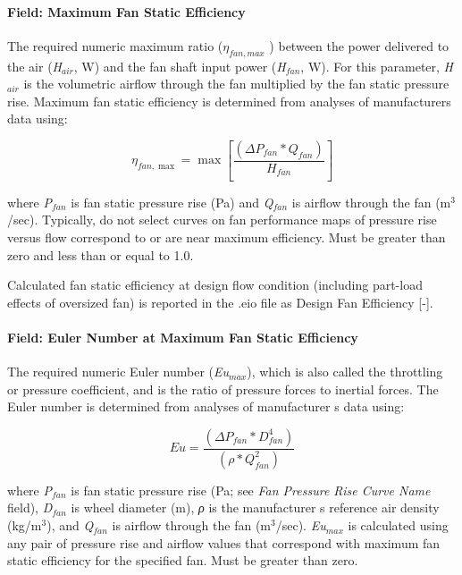 \paragraph{Field: Maximum Fan Static Efficiency}\label{field-maximum-fan-static-efficiency}

The required numeric maximum ratio (\(\eta_{fan,max}\) ) between the power delivered to the air (\emph{H\(_{air}\)}, W) and the fan shaft input power (\emph{H\(_{fan}\)}, W). For this parameter, \emph{H\(_{air}\)} is the volumetric airflow through the fan multiplied by the fan static pressure rise. Maximum fan static efficiency is determined from analyses of manufacturers data using:

\begin{equation}
{\eta_{fan,\max }} = \max \left[ {\frac{{\left( {\Delta {P_{fan}} * {Q_{fan}}} \right)}}{{{H_{fan}}}}} \right]
\end{equation}

where \emph{P\(_{fan}\)} is fan static pressure rise (Pa) and \emph{Q\(_{fan}\)} is airflow through the fan (m\(^{3}\)/sec). Typically, do not select curves on fan performance maps of pressure rise versus flow correspond to or are near maximum efficiency. Must be greater than zero and less than or equal to 1.0.

Calculated fan static efficiency at design flow condition (including part-load effects of oversized fan) is reported in the .eio file as Design Fan Efficiency {[}-{]}.

\paragraph{Field: Euler Number at Maximum Fan Static Efficiency}\label{field-euler-number-at-maximum-fan-static-efficiency}

The required numeric Euler number (\emph{Eu\(_{max}\)}), which is also called the throttling or pressure coefficient, and is the ratio of pressure forces to inertial forces. The Euler number is determined from analyses of manufacturer s data using:

\begin{equation}
Eu = \frac{{\left( {\Delta {P_{fan}} * D_{fan}^4} \right)}}{{\left( {\rho  * Q_{fan}^2} \right)}}
\end{equation}

where \emph{P\(_{fan}\)} is fan static pressure rise (Pa; see \emph{Fan Pressure Rise Curve Name} field), \emph{D\(_{fan}\)} is wheel diameter (m), \emph{ρ} is the manufacturer s reference air density (kg/m\(^{3}\)), and \emph{Q\(_{fan}\)} is airflow through the fan (m\(^{3}\)/sec). \emph{Eu\(_{max}\)} is calculated using any pair of pressure rise and airflow values that correspond with maximum fan static efficiency for the specified fan. Must be greater than zero.

